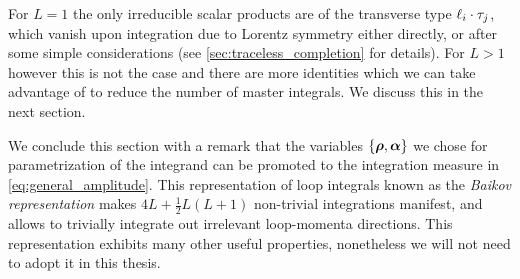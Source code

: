 For $L=1$ the only irreducible scalar products are of the transverse type $\sp(\ell_i, \tau_j)$, which vanish upon integration due to Lorentz symmetry either directly,
or after some simple considerations (see \cref{sec:traceless_completion} for details).
For $L>1$ however this is not the case and there are more identities which we can take advantage of to reduce the number of master integrals.
We discuss this in the next section.


We conclude this section with a remark that the variables $\{\vb*{\rho},\vb*{\alpha}\}$ we chose for parametrization of the integrand can be promoted
to the integration measure in \cref{eq:general_amplitude}. This representation of loop integrals known as the \emph{Baikov representation} \cite{Baikov:1996rk} 
makes $4 L +\frac{1}{2}L(L+1)$ non-trivial integrations manifest, and allows to trivially integrate out irrelevant loop-momenta directions. This representation
exhibits many other useful properties, nonetheless we will not need to adopt it in this thesis.




